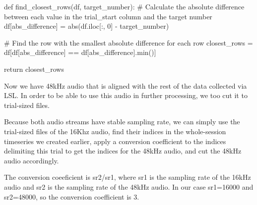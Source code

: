 \documentclass[
  letterpaper,
  DIV=11,
  numbers=noendperiod]{scrreprt}
\newenvironment{Shaded}{\begin{snugshade}}{\end{snugshade}}
\newcommand{\BuiltInTok}[1]{\textcolor[rgb]{0.00,0.23,0.31}{#1}}
\newcommand{\CommentTok}[1]{\textcolor[rgb]{0.37,0.37,0.37}{#1}}
\newcommand{\ControlFlowTok}[1]{\textcolor[rgb]{0.00,0.23,0.31}{#1}}
\newcommand{\DecValTok}[1]{\textcolor[rgb]{0.68,0.00,0.00}{#1}}
\newcommand{\KeywordTok}[1]{\textcolor[rgb]{0.00,0.23,0.31}{#1}}
\newcommand{\NormalTok}[1]{\textcolor[rgb]{0.00,0.23,0.31}{#1}}
\newcommand{\OperatorTok}[1]{\textcolor[rgb]{0.37,0.37,0.37}{#1}}
\newcommand{\StringTok}[1]{\textcolor[rgb]{0.13,0.47,0.30}{#1}}
\begin{document}
\begin{Shaded}
\begin{Highlighting}[]
\KeywordTok{def}\NormalTok{ find\_closest\_rows(df, target\_number):}
    \CommentTok{\# Calculate the absolute difference between each value in the \textquotesingle{}trial\_start\textquotesingle{} column and the target number}
\NormalTok{    df[}\StringTok{\textquotesingle{}abs\_difference\textquotesingle{}}\NormalTok{] }\OperatorTok{=} \BuiltInTok{abs}\NormalTok{(df.iloc[:, }\DecValTok{0}\NormalTok{] }\OperatorTok{{-}}\NormalTok{ target\_number)}
    
    \CommentTok{\# Find the row with the smallest absolute difference for each row}
\NormalTok{    closest\_rows }\OperatorTok{=}\NormalTok{ df[df[}\StringTok{\textquotesingle{}abs\_difference\textquotesingle{}}\NormalTok{] }\OperatorTok{==}\NormalTok{ df[}\StringTok{\textquotesingle{}abs\_difference\textquotesingle{}}\NormalTok{].}\BuiltInTok{min}\NormalTok{()]}

    \ControlFlowTok{return}\NormalTok{ closest\_rows}
\end{Highlighting}
\end{Shaded}

Now we have 48kHz audio that is aligned with the rest of the data
collected via LSL. In order to be able to use this audio in further
processing, we too cut it to trial-sized files.

Because both audio streams have stable sampling rate, we can simply use
the trial-sized files of the 16Khz audio, find their indices in the
whole-session timeseries we created earlier, apply a conversion
coefficient to the indices delimiting this trial to get the indices for
the 48kHz audio, and cut the 48kHz audio accordingly.

The conversion coeeficient is sr2/sr1, where sr1 is the sampling rate of
the 16kHz audio and sr2 is the sampling rate of the 48kHz audio. In our
case sr1=16000 and sr2=48000, so the conversion coefficient is 3.
\end{document}
